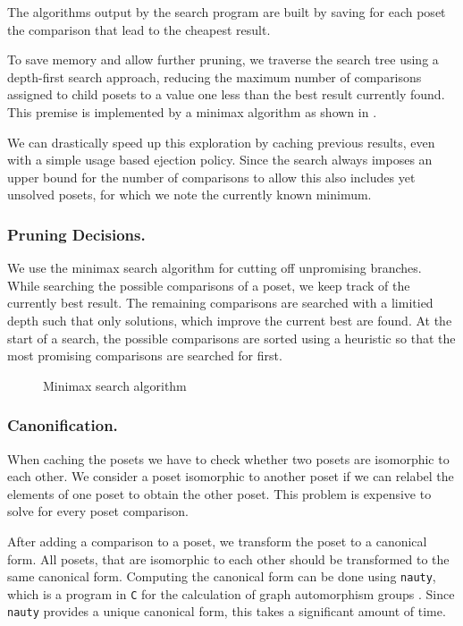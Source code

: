 \documentclass[twoside,leqno,twocolumn]{article}
\begin{document}
The algorithms output by the search program are built by saving for each poset the comparison that lead to the cheapest result.

To save memory and allow further pruning, we traverse the search tree using a depth-first search approach, reducing the maximum number of comparisons assigned to child posets to a value one less than the best result currently found.
This premise is implemented by a minimax algorithm as shown in .

We can drastically speed up this exploration by caching previous results, even with a simple usage based ejection policy.
Since the search always imposes an upper bound for the number of comparisons to allow this also includes yet unsolved posets, for which we note the currently known minimum.

\subsubsection{Pruning Decisions.}
We use the minimax search algorithm for cutting off unpromising branches.
While searching the possible comparisons of a poset, we keep track of the currently best result.
The remaining comparisons are searched with a limitied depth such that only solutions, which improve the current best are found.
At the start of a search, the possible comparisons are sorted using a heuristic so that the most promising comparisons are searched for first.

\begin{figure}[!b]
  \centering
  
  \caption{Minimax search algorithm}
  \label{fig:minimax_search}
\end{figure}

\subsubsection{Canonification.}
When caching the posets we have to check whether two posets are isomorphic to each other.
We consider a poset isomorphic to another poset if we can relabel the elements of one poset to obtain the other poset.
This problem is expensive to solve for every poset comparison.

After adding a comparison to a poset, we transform the poset to a canonical form.
All posets, that are isomorphic to each other should be transformed to the same canonical form.
Computing the canonical form can be done using \texttt{nauty}, which is a program in \texttt{C} for the calculation of graph automorphism groups \cite[Practical Graph Isomorphism]{MCKAY201494}.
Since \texttt{nauty} provides a unique canonical form, this takes a significant amount of time.
\end{document}
